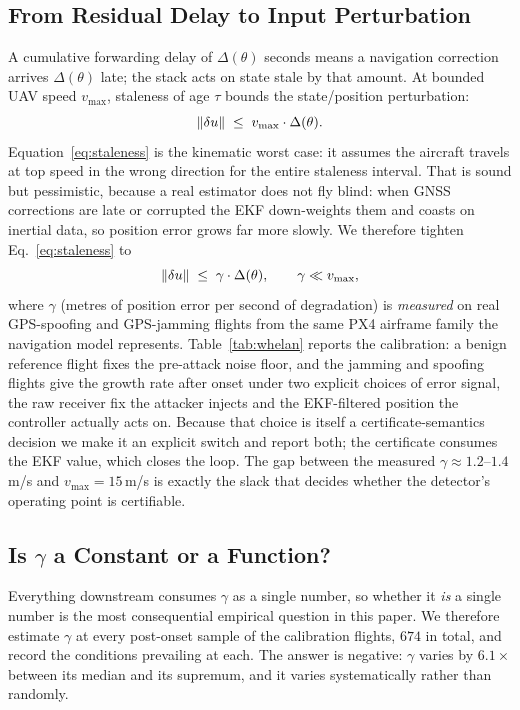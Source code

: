 \subsection{From Residual Delay to Input Perturbation}
A cumulative forwarding delay of $\Delta(\theta)$ seconds means a navigation
correction arrives $\Delta(\theta)$ late; the stack acts on state stale by that
amount. At bounded UAV speed $v_{\max}$, staleness of age $\tau$ bounds the
state/position perturbation:
\begin{equation}
\label{eq:staleness}
\left\lVert \delta u\right\rVert \;\le\; v_{\max}\cdot \Delta(\theta).
\end{equation}
Equation~\eqref{eq:staleness} is the kinematic worst case: it assumes the
aircraft travels at top speed in the wrong direction for the entire staleness
interval. That is sound but pessimistic, because a real estimator does not fly
blind: when GNSS corrections are late or corrupted the EKF down-weights them
and coasts on inertial data, so position error grows far more slowly. We
therefore tighten Eq.~\eqref{eq:staleness} to
\begin{equation}
\label{eq:gamma}
\left\lVert \delta u\right\rVert\;\le\;\gamma\cdot\Delta(\theta),\qquad \gamma\ll v_{\max},
\end{equation}
where $\gamma$ (metres of position error per second of degradation) is
\emph{measured} on real GPS-spoofing and GPS-jamming flights from the same PX4
airframe family the navigation model represents. Table~\ref{tab:whelan} reports
the calibration: a benign reference flight fixes the pre-attack noise floor, and
the jamming and spoofing flights give the growth rate after onset under two
explicit choices of error signal, the raw receiver fix the attacker injects
and the EKF-filtered position the controller actually acts on. Because that
choice is itself a certificate-semantics decision we make it an explicit switch
and report both; the certificate consumes the EKF value, which closes the loop.
The gap between the measured $\gamma\approx1.2$--$1.4$\,m/s and
$v_{\max}=15$\,m/s is exactly the slack that decides whether the detector's
operating point is certifiable.

\subsection{Is $\gamma$ a Constant or a Function?}
\label{sec:gammastability}
Everything downstream consumes $\gamma$ as a single number, so whether it
\emph{is} a single number is the most consequential empirical question in this
paper. We therefore estimate $\gamma$ at every post-onset sample of the
calibration flights, $674$ in total, and record the conditions prevailing at
each. The answer is negative: $\gamma$ varies by $6.1\times$ between its median
and its supremum, and it varies systematically rather than randomly.


